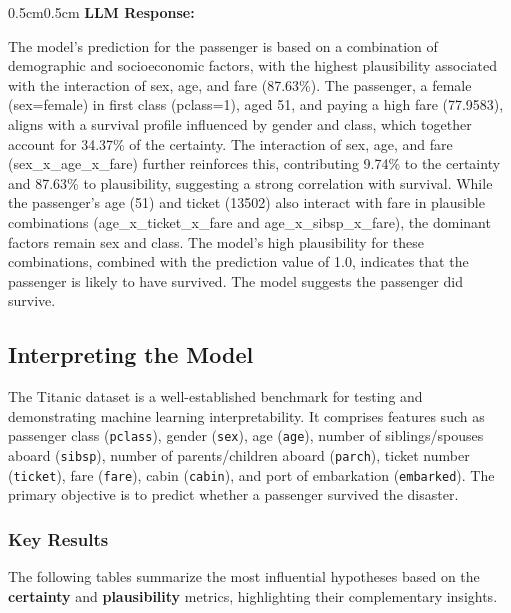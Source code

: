 \documentclass[acmlarge]{acmart}
\begin{document}
\begin{adjustwidth}{0.5cm}{0.5cm}
\vspace{0.5em}
\noindent\textbf{LLM Response:}

The model's prediction for the passenger is based on a combination of demographic and socioeconomic factors, with the highest plausibility associated with the interaction of sex, age, and fare (87.63\%). The passenger, a female (sex=female) in first class (pclass=1), aged 51, and paying a high fare (77.9583), aligns with a survival profile influenced by gender and class, which together account for 34.37\% of the certainty. The interaction of sex, age, and fare (sex\_x\_age\_x\_fare) further reinforces this, contributing 9.74\% to the certainty and 87.63\% to plausibility, suggesting a strong correlation with survival. While the passenger's age (51) and ticket (13502) also interact with fare in plausible combinations (age\_x\_ticket\_x\_fare and age\_x\_sibsp\_x\_fare), the dominant factors remain sex and class. The model's high plausibility for these combinations, combined with the prediction value of 1.0, indicates that the passenger is likely to have survived. The model suggests the passenger did survive.

\end{adjustwidth}

\subsection{Interpreting the Model}

The Titanic dataset is a well-established benchmark for testing and demonstrating machine learning interpretability. It comprises features such as passenger class (\texttt{pclass}), gender (\texttt{sex}), age (\texttt{age}), number of siblings/spouses aboard (\texttt{sibsp}), number of parents/children aboard (\texttt{parch}), ticket number (\texttt{ticket}), fare (\texttt{fare}), cabin (\texttt{cabin}), and port of embarkation (\texttt{embarked}). The primary objective is to predict whether a passenger survived the disaster.


\subsubsection{Key Results}

The following tables summarize the most influential hypotheses based on the \textbf{certainty} and \textbf{plausibility} metrics, highlighting their complementary insights.
\end{document}
